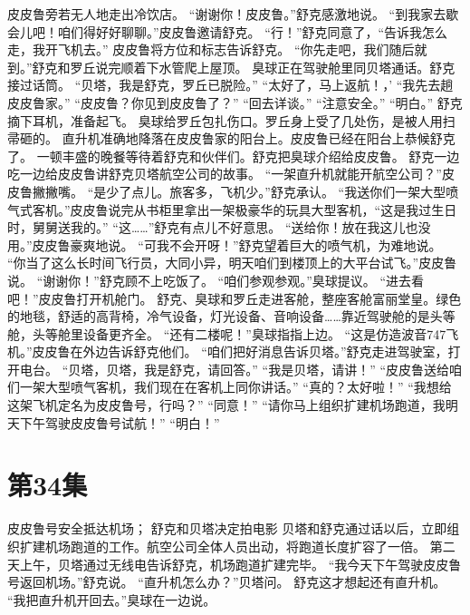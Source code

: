 \documentclass[a4paper,12pt,UTF8,twoside]{ctexbook}
\begin{document}
        皮皮鲁旁若无人地走出冷饮店。 
        “谢谢你！皮皮鲁。”舒克感激地说。 
        “到我家去歇会儿吧！咱们得好好聊聊。”皮皮鲁邀请舒克。 
        “行！”舒克同意了，“告诉我怎么走，我开飞机去。” 
        皮皮鲁将方位和标志告诉舒克。 
        “你先走吧，我们随后就到。”舒克和罗丘说完顺着下水管爬上屋顶。 
        臭球正在驾驶舱里同贝塔通话。舒克接过话筒。 
        “贝塔，我是舒克，罗丘已脱险。” 
        “太好了，马上返航！，’ 
        “我先去趟皮皮鲁家。” 
        “皮皮鲁？你见到皮皮鲁了？” 
        “回去详谈。” 
        “注意安全。” 
        “明白。” 
        舒克摘下耳机，准备起飞。 
        臭球给罗丘包扎伤口。罗丘身上受了几处伤，是被人用扫帚砸的。 
        直升机准确地降落在皮皮鲁家的阳台上。皮皮鲁已经在阳台上恭候舒克了。 
        一顿丰盛的晚餐等待着舒克和伙伴们。舒克把臭球介绍给皮皮鲁。 
        舒克一边吃一边给皮皮鲁讲舒克贝塔航空公司的故事。 
        “一架直升机就能开航空公司？”皮皮鲁撇撇嘴。 
        “是少了点儿。旅客多，飞机少。”舒克承认。 
        “我送你们一架大型喷气式客机。”皮皮鲁说完从书柜里拿出一架极豪华的玩具大型客机，“这是我过生日时，舅舅送我的。” 
        “这……”舒克有点儿不好意思。 
        “送给你！放在我这儿也没用。”皮皮鲁豪爽地说。 
        “可我不会开呀！”舒克望着巨大的喷气机，为难地说。 
        “你当了这么长时间飞行员，大同小异，明天咱们到楼顶上的大平台试飞。”皮皮鲁说。 
        “谢谢你！”舒克顾不上吃饭了。 
        “咱们参观参观。”臭球提议。 
        “进去看吧！”皮皮鲁打开机舱门。 
        舒克、臭球和罗丘走进客舱，整座客舱富丽堂皇。绿色的地毯，舒适的高背椅，冷气设备，灯光设备、音响设备……靠近驾驶舱的是头等舱，头等舱里设备更齐全。 
        “还有二楼呢！”臭球指指上边。 
        “这是仿造波音747飞机。”皮皮鲁在外边告诉舒克他们。 
        “咱们把好消息告诉贝塔。”舒克走进驾驶室，打开电台。 
        “贝塔，贝塔，我是舒克，请回答。” 
        “我是贝塔，请讲！” 
        “皮皮鲁送给咱们一架大型喷气客机，我们现在在客机上同你讲话。” 
        “真的？太好啦！” 
        “我想给这架飞机定名为皮皮鲁号，行吗？” 
        “同意！” 
        “请你马上组织扩建机场跑道，我明天下午驾驶皮皮鲁号试航！” 
        “明白！”   \chapter{第34集} 
        皮皮鲁号安全抵达机场； 
        舒克和贝塔决定拍电影   
        贝塔和舒克通过话以后，立即组织扩建机场跑道的工作。航空公司全体人员出动，将跑道长度扩容了一倍。 
        第二天上午，贝塔通过无线电告诉舒克，机场跑道扩建完毕。 
        “我今天下午驾驶皮皮鲁号返回机场。”舒克说。 
        “直升机怎么办？”贝塔问。 
        舒克这才想起还有直升机。 
        “我把直升机开回去。”臭球在一边说。 
\end{document}
